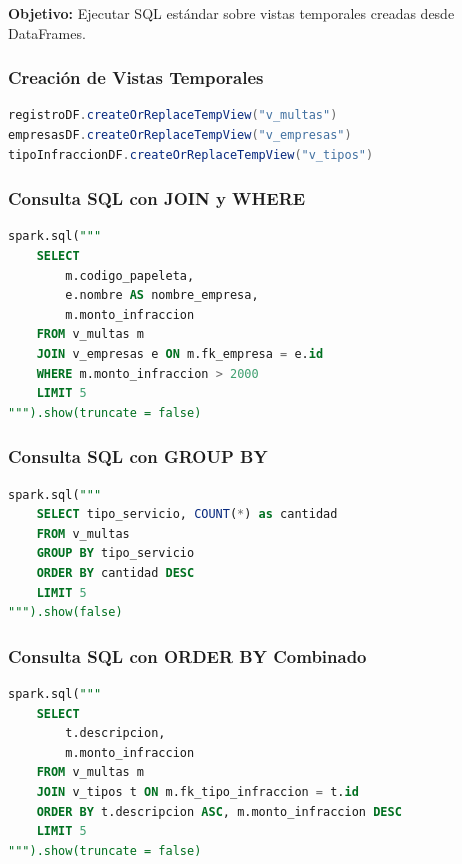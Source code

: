 \documentclass[12pt,a4paper]{article}
\begin{document}
\textbf{Objetivo:} Ejecutar SQL estándar sobre vistas temporales creadas desde DataFrames.

\subsubsection{Creación de Vistas Temporales}

\begin{lstlisting}[language=Scala, caption={Registro de vistas SQL}]
registroDF.createOrReplaceTempView("v_multas")
empresasDF.createOrReplaceTempView("v_empresas")
tipoInfraccionDF.createOrReplaceTempView("v_tipos")
\end{lstlisting}

\subsubsection{Consulta SQL con JOIN y WHERE}

\begin{lstlisting}[language=SQL, caption={Selección con JOIN y filtro}]
spark.sql("""
    SELECT 
        m.codigo_papeleta, 
        e.nombre AS nombre_empresa, 
        m.monto_infraccion
    FROM v_multas m
    JOIN v_empresas e ON m.fk_empresa = e.id
    WHERE m.monto_infraccion > 2000
    LIMIT 5
""").show(truncate = false)
\end{lstlisting}

\subsubsection{Consulta SQL con GROUP BY}

\begin{lstlisting}[language=SQL, caption={Agrupamiento y conteo}]
spark.sql("""
    SELECT tipo_servicio, COUNT(*) as cantidad
    FROM v_multas
    GROUP BY tipo_servicio
    ORDER BY cantidad DESC
    LIMIT 5
""").show(false)
\end{lstlisting}

\subsubsection{Consulta SQL con ORDER BY Combinado}

\begin{lstlisting}[language=SQL, caption={Ordenamiento con JOIN}]
spark.sql("""
    SELECT 
        t.descripcion, 
        m.monto_infraccion
    FROM v_multas m
    JOIN v_tipos t ON m.fk_tipo_infraccion = t.id
    ORDER BY t.descripcion ASC, m.monto_infraccion DESC
    LIMIT 5
""").show(truncate = false)
\end{lstlisting}
\end{document}
